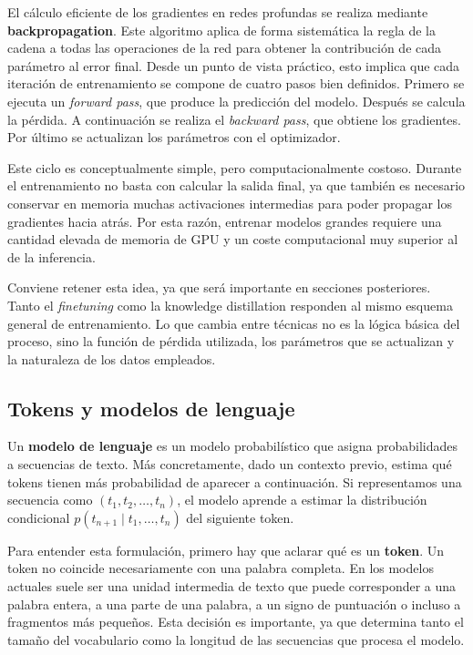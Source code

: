 El cálculo eficiente de los gradientes en redes profundas se realiza mediante \textbf{backpropagation}. Este algoritmo aplica de forma sistemática la regla de la cadena a todas las operaciones de la red para obtener la contribución de cada parámetro al error final. Desde un punto de vista práctico, esto implica que cada iteración de entrenamiento se compone de cuatro pasos bien definidos. Primero se ejecuta un \textit{forward pass}, que produce la predicción del modelo. Después se calcula la pérdida. A continuación se realiza el \textit{backward pass}, que obtiene los gradientes. Por último se actualizan los parámetros con el optimizador.

Este ciclo es conceptualmente simple, pero computacionalmente costoso. Durante el entrenamiento no basta con calcular la salida final, ya que también es necesario conservar en memoria muchas activaciones intermedias para poder propagar los gradientes hacia atrás. Por esta razón, entrenar modelos grandes requiere una cantidad elevada de memoria de GPU y un coste computacional muy superior al de la inferencia.

Conviene retener esta idea, ya que será importante en secciones posteriores. Tanto el \textit{finetuning} como la knowledge distillation responden al mismo esquema general de entrenamiento. Lo que cambia entre técnicas no es la lógica básica del proceso, sino la función de pérdida utilizada, los parámetros que se actualizan y la naturaleza de los datos empleados.

\subsection{Tokens y modelos de lenguaje}

Un \textbf{modelo de lenguaje} es un modelo probabilístico que asigna probabilidades a secuencias de texto. Más concretamente, dado un contexto previo, estima qué tokens tienen más probabilidad de aparecer a continuación. Si representamos una secuencia como $(t_1, t_2, \dots, t_n)$, el modelo aprende a estimar la distribución condicional $p(t_{n+1} \mid t_1, \dots, t_n)$ del siguiente token.

Para entender esta formulación, primero hay que aclarar qué es un \textbf{token}. Un token no coincide necesariamente con una palabra completa. En los modelos actuales suele ser una unidad intermedia de texto que puede corresponder a una palabra entera, a una parte de una palabra, a un signo de puntuación o incluso a fragmentos más pequeños. Esta decisión es importante, ya que determina tanto el tamaño del vocabulario como la longitud de las secuencias que procesa el modelo.

